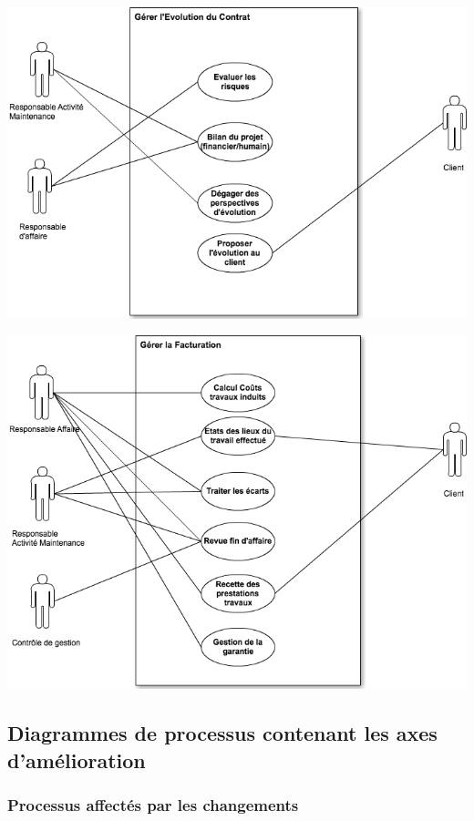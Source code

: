 \begin {center}
\includegraphics[width=\textwidth]{png_generaux/DCUGererEvolutionContrat.png}
\end {center}

\begin {center}
\includegraphics[width=\textwidth]{png_generaux/DCUGererFacturation.png}
\end {center}

\subsection{Diagrammes de processus contenant les axes d'amélioration}
\subsubsection{Processus affectés par les changements}

